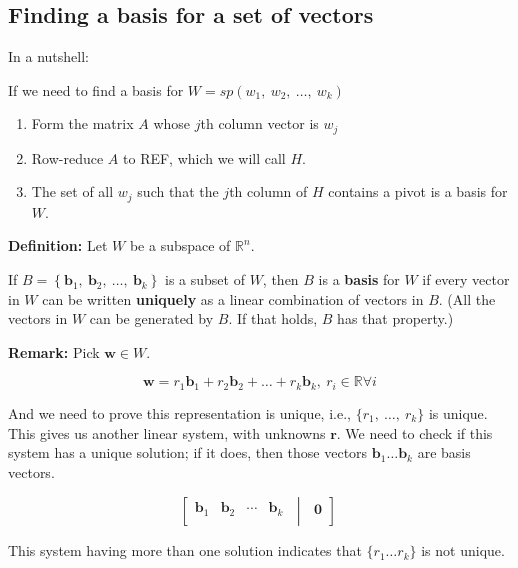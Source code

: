 \documentclass[12pt]{article}
\theoremstyle{plain}
\theoremstyle{remark}
\theoremstyle{definition}
\begin{document}
\subsection{Finding a basis for a set of
vectors}

In a nutshell:

If we need to find a basis for
\(W = sp\left( w_{1},\ w_{2},\ \ldots,\ w_{k} \right)\)

\begin{enumerate}
\def\labelenumi{\arabic{enumi}.}
\item
  Form the matrix \(A\) whose \(j\)th column vector is \(w_{j}\)
\item
  Row-reduce \(A\) to REF, which we will call \(H\).
\item
  The set of all \(w_{j}\) such that the \(j\)th column of \(H\)
  contains a pivot is a basis for \(W\).
\end{enumerate}

\textbf{Definition:} Let \(W\) be a subspace of \(\mathbb{R}^{n}\).

If
\(Β = \left\{ {\mathbf{b}}_{1},\ {\mathbf{b}}_{2},\ \ldots,\ {\mathbf{b}}_{k} \right\}\)
is a subset of \(W\), then \(B\) is a \textbf{basis} for \(W\) if every
vector in \(W\) can be written \textbf{uniquely} as a linear combination
of vectors in \(B\). (All the vectors in \(W\) can be generated by
\(B\). If that holds, \(B\) has that property.)

\textbf{Remark:} Pick \(\mathbf{w} \in W\).

\[\mathbf{w} = r_{1}{\mathbf{b}}_{1} + r_{2}{\mathbf{b}}_{2} + \ldots + r_{k}{\mathbf{b}}_{k},\ r_{i}\mathbb{\in R\forall}i\]

And we need to prove this representation is unique, i.e.,
\(\{ r_{1},\ \ldots,\ r_{k}\}\) is unique. This gives us another linear
system, with unknowns \(\mathbf{r}\). We need to check if this
system has a unique solution; if it does, then those vectors
\({\mathbf{b}}_{1}\ldots{\mathbf{b}}_{k}\) are basis vectors.

\[\left\lbrack \begin{matrix}
{\mathbf{b}}_{1} & {\mathbf{b}}_{2} & \cdots & {\mathbf{b}}_{k} \\
\end{matrix}\;\middle|\;\begin{matrix}
\mathbf{0} \\
\end{matrix} \right\rbrack\ \]

This system having more than one solution indicates that
\(\{ r_{1}\ldots r_{k}\}\) is not unique.
\end{document}
